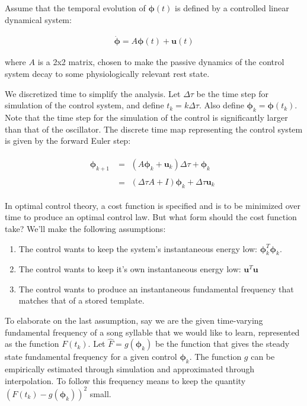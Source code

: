 \documentclass{article} %
\begin{document}
Assume that the temporal evolution of $\bm{\phi}(t)$ is defined by a controlled linear dynamical
system:

\begin{align*}
\dot{\bm{\phi}}=A\bm{\phi}(t) + \bm{u}(t)
\end{align*}

where $A$ is a 2x2 matrix, chosen to make the passive dynamics of the control system decay
to some physiologically relevant rest state.

We discretized time to simplify the analysis. Let $\Delta\tau$ be the time step for
simulation of the control system, and define $t_k = k\Delta\tau$. Also define
$\bm{\phi}_k = \bm{\phi}(t_k)$. Note that the time step for the simulation of the
control is significantly larger than that of the oscillator. The discrete time map
representing the control system is given by the forward Euler step:

\begin{align*}
\bm{\phi}_{k+1} &= \begin{aligned}\left( A\bm{\phi}_k + \bm{u}_k \right) \Delta\tau + \bm{\phi}_{k}\end{aligned} \\
                &=\begin{aligned}\left( \Delta\tau A + I \right) \bm{\phi}_k + \Delta\tau \bm{u}_k\end{aligned}
\end{align*}

In optimal control theory, a cost function is specified and is to be minimized over time to
produce an optimal control law. But what form should the cost function take? We'll make
the following assumptions:

\begin{enumerate}

\item The control wants to keep the system's instantaneous energy low: $\bm{\phi}_k^T \bm{\phi}_k$.
\item The control wants to keep it's own instantaneous energy low: $\bm{u}^T \bm{u}$ 
\item The control wants to produce an instantaneous fundamental frequency that matches that of a stored template.

\end{enumerate}

To elaborate on the last assumption, say we are the given time-varying fundamental frequency
of a song syllable that we would like to learn, represented as the function $F(t_k)$. Let
$\hat{F} = g(\bm{\phi}_k)$ be the function that gives the steady state fundamental
frequency for a given control $\bm{\phi}_k$. The function $g$ can be empirically
estimated through simulation and approximated through interpolation. To follow this
frequency means to keep the quantity $\left( F(t_k) - g(\bm{\phi}_k) \right) ^2$ small.
\end{document}
